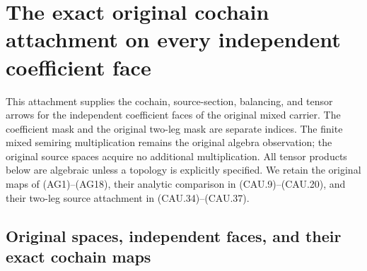 \section{The exact original cochain attachment on every independent coefficient face}
\label{sec:coefficient-face-cochain-attachment}

This attachment supplies the cochain, source-section, balancing, and tensor
arrows for the independent coefficient faces of the original mixed carrier.
The coefficient mask and the original two-leg mask are separate indices.
The finite mixed semiring multiplication remains the original algebra
observation; the original source spaces acquire no additional multiplication.
All tensor products below are algebraic unless a topology is explicitly
specified.  We retain the original maps of (AG1)--(AG18), their analytic
comparison in (CAU.9)--(CAU.20), and their two-leg source attachment in
(CAU.34)--(CAU.37).

\subsection{Original spaces, independent faces, and their exact cochain maps}

